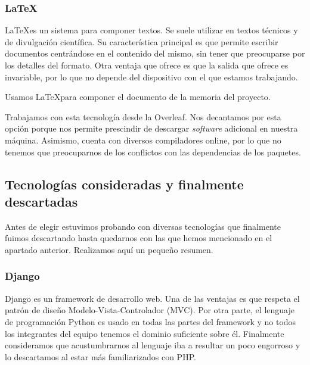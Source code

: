 \subsubsection{\LaTeX}
\LaTeX es un sistema para componer textos. Se suele utilizar en textos técnicos y de divulgación científica. Su característica principal es que permite escribir documentos centrándose en el contenido del mismo, sin tener que preocuparse por los detalles del formato. Otra ventaja que ofrece es que la salida que ofrece es invariable, por lo que no depende del dispositivo con el que estamos trabajando. \par 

Usamos \LaTeX para componer el documento de la memoria del proyecto. \par 

Trabajamos con esta tecnología desde la Overleaf. Nos decantamos por esta opción porque nos permite prescindir de descargar \textit{software} adicional en nuestra máquina. Asimismo, cuenta con diversos compiladores online, por lo que no tenemos que preocuparnos de los conflictos con las dependencias de los paquetes. \par 

\subsection{Tecnologías consideradas y finalmente descartadas}
\label{subsec:rejected}
Antes de elegir estuvimos probando con diversas tecnologías que finalmente fuimos descartando hasta quedarnos con las que hemos mencionado en el apartado anterior. Realizamos aquí un pequeño resumen. \par 

\subsubsection{Django}
Django es un framework de desarrollo web. Una de las ventajas es que respeta el patrón de diseño Modelo-Vista-Controlador (MVC). Por otra parte, el lenguaje de programación Python es usado en todas las partes del framework y no todos los integrantes del equipo tenemos el dominio suficiente sobre él. Finalmente consideramos que acustumbrarnos al lenguaje iba a resultar un poco engorroso y lo descartamos al estar más familiarizados con PHP. \par 


